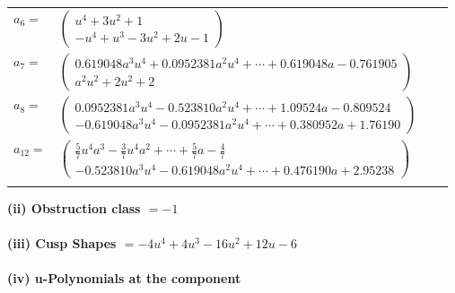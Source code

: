 \documentclass[1p]{elsarticle_modified}
\theoremstyle{definition}
\begin{document}
\begin{tabular}{m{7pt} m{180pt} m{7pt} m{180pt} }
\flushright $a_{6}=$&$\begin{pmatrix}u^4+3 u^2+1\\- u^4+u^3-3 u^2+2 u-1\end{pmatrix}$ \\
\flushright $a_{7}=$&$\begin{pmatrix}0.619048 a^{3} u^{4}+0.0952381 a^{2} u^{4}+\cdots+0.619048 a-0.761905\\a^2 u^2+2 u^2+2\end{pmatrix}$ \\
\flushright $a_{8}=$&$\begin{pmatrix}0.0952381 a^{3} u^{4}-0.523810 a^{2} u^{4}+\cdots+1.09524 a-0.809524\\-0.619048 a^{3} u^{4}-0.0952381 a^{2} u^{4}+\cdots+0.380952 a+1.76190\end{pmatrix}$ \\
\flushright $a_{12}=$&$\begin{pmatrix}\frac{5}{7} u^4 a^3-\frac{3}{7} u^4 a^2+\cdots+\frac{5}{7} a-\frac{4}{7}\\-0.523810 a^{3} u^{4}-0.619048 a^{2} u^{4}+\cdots+0.476190 a+2.95238\end{pmatrix}$\\&\end{tabular}
\flushleft \textbf{(ii) Obstruction class $= -1$}\\~\\
\flushleft \textbf{(iii) Cusp Shapes $= -4 u^4+4 u^3-16 u^2+12 u-6$}\\~\\
\newpage\renewcommand{\arraystretch}{1}
\flushleft \textbf{(iv) u-Polynomials at the component}\newline \\
\end{document}

